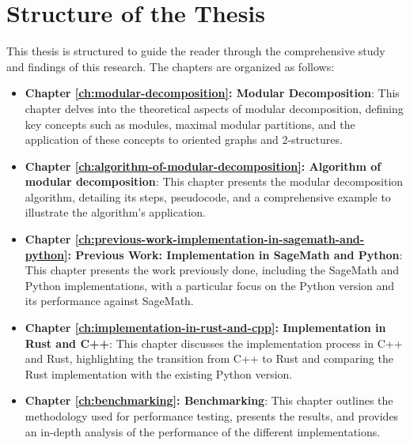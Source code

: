 \section{Structure of the Thesis}\label{sec:structure-of-the-thesis}

This thesis is structured to guide the reader through the comprehensive study and findings of this research.
The chapters are organized as follows:

\begin{itemize}
    \item \textbf{Chapter \ref{ch:modular-decomposition}: Modular Decomposition}: This chapter delves into the theoretical aspects of modular decomposition, defining key concepts such as modules, maximal modular partitions, and the application of these concepts to oriented graphs and 2-structures.
    \item \textbf{Chapter \ref{ch:algorithm-of-modular-decomposition}: Algorithm of modular decomposition}: This chapter presents the modular decomposition algorithm, detailing its steps, pseudocode, and a comprehensive example to illustrate the algorithm's application.
    \item \textbf{Chapter \ref{ch:previous-work-implementation-in-sagemath-and-python}: Previous Work: Implementation in SageMath and Python}: This chapter presents the work previously done, including the SageMath and Python implementations, with a particular focus on the Python version and its performance against SageMath.
    \item \textbf{Chapter \ref{ch:implementation-in-rust-and-cpp}: Implementation in Rust and C++}: This chapter discusses the implementation process in C++ and Rust, highlighting the transition from C++ to Rust and comparing the Rust implementation with the existing Python version.
    \item \textbf{Chapter \ref{ch:benchmarking}: Benchmarking}: This chapter outlines the methodology used for performance testing, presents the results, and provides an in-depth analysis of the performance of the different implementations.
\end{itemize}


